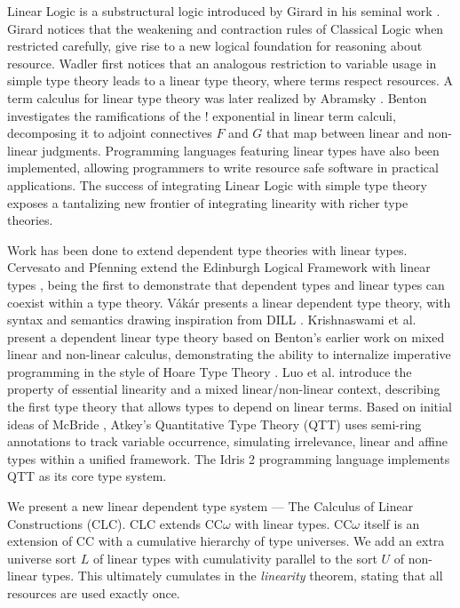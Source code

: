 \documentclass[sigplan,screen,review,authordraft]{acmart}
\theoremstyle{definition}
\begin{document}
  Linear Logic is a substructural logic introduced by Girard in his seminal work \cite{girard}. Girard notices that the weakening and contraction rules of Classical Logic when restricted carefully, give rise to a new logical foundation for reasoning about resource. Wadler \cite{wadler1990,wadler1991} first notices that an analogous restriction to variable usage in simple type theory leads to a linear type theory, where terms respect resources. A term calculus for linear type theory was later realized by Abramsky \cite{abramsky1993}. Benton \cite{benton1994} investigates the ramifications of the ! exponential in linear term calculi, decomposing it to adjoint connectives $F$ and $G$ that map between linear and non-linear judgments. Programming languages \cite{l3,ats,linear-haskell} featuring linear types have also been implemented, allowing programmers to write resource safe software in practical applications. The success of integrating Linear Logic with simple type theory exposes a tantalizing new frontier of integrating linearity with richer type theories.

  Work has been done to extend dependent type theories with linear types. Cervesato and Pfenning extend the Edinburgh Logical Framework with linear types \cite{lf,llf}, being the first to demonstrate that dependent types and linear types can coexist within a type theory. V\'{a}k\'{a}r \cite{vakar14} presents a linear dependent type theory, with syntax and semantics drawing inspiration from DILL \cite{dill}.  Krishnaswami et al. present a dependent linear type theory \cite{neel15} based on Benton's earlier work on mixed linear and non-linear calculus, demonstrating the ability to internalize imperative programming in the style of Hoare Type Theory \cite{htt}. Luo et al. introduce the property of essential linearity and a mixed linear/non-linear context, describing the first type theory that allows types to depend on linear terms. Based on initial ideas of McBride \cite{nothing}, Atkey's Quantitative Type Theory (QTT) \cite{qtt} uses semi-ring annotations to track variable occurrence, simulating irrelevance, linear and affine types within a unified framework. The Idris 2 programming language \cite{idris2} implements QTT as its core type system.

  We present a new linear dependent type system --- The Calculus of Linear Constructions (CLC). CLC extends CC$\omega$ with linear types. CC$\omega$ itself is an extension of CC with a cumulative hierarchy of type universes. We add an extra universe sort $L$ of linear types with cumulativity parallel to the sort $U$ of non-linear types. This ultimately cumulates in the \textit{linearity} theorem, stating that all resources are used exactly once.
\end{document}
